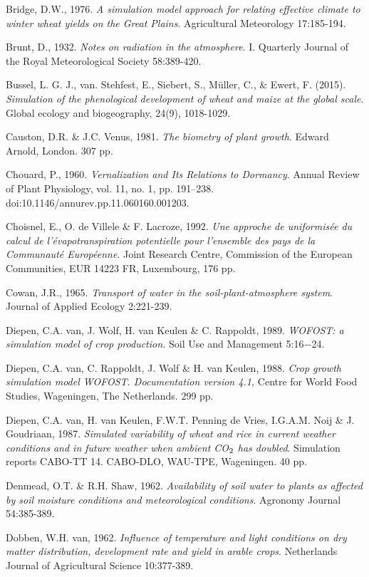Bridge, D.W., 1976. {\it A simulation model approach for relating effective climate to winter
wheat yields on the Great Plains\/}. Agricultural Meteorology 17:185-194.

Brunt, D., 1932. {\it Notes on radiation in the atmosphere\/}. I. Quarterly Journal of the Royal
Meteorological Society 58:389-420.

Bussel, L. G. J., van. Stehfest, E., Siebert, S., Müller, C., \& Ewert, F. (2015). {\it Simulation of 
the phenological development of wheat and maize at the global scale}. Global ecology and biogeography, 
24(9), 1018-1029.

Causton, D.R. \& J.C. Venus, 1981. {\it The biometry of plant growth\/}. Edward Arnold, London.
307 pp.

Chouard, P., 1960. \textit{Vernalization and Its Relations to Dormancy}. Annual Review of Plant Physiology, vol. 11, no. 1, pp. 191–238. doi:10.1146/annurev.pp.11.060160.001203.

Choisnel, E., O. de Villele \& F. Lacroze, 1992. {\it Une approche de uniformis\'{e}e du calcul de
l'\'{e}vapotranspiration potentielle pour l'ensemble des pays de la Communaut\'{e} Europ\'{e}enne\/}.
Joint Research Centre, Commission of the European Communities, EUR 14223 FR,
Luxembourg, 176 pp.

Cowan, J.R., 1965. {\it Transport of water in the soil-plant-atmosphere system\/}. Journal of
Applied Ecology 2:221-239.

Diepen, C.A. van, J. Wolf, H. van Keulen \& C. Rappoldt, 1989. {\it WOFOST: a simulation
model of crop production.\/} Soil Use and Management 5:16$-$24. 

Diepen, C.A. van, C. Rappoldt, J. Wolf \& H. van Keulen, 1988. {\it Crop growth simulation
model WOFOST. Documentation version 4.1,\/} Centre for World Food Studies, Wageningen,
The Netherlands. 299 pp. 

Diepen, C.A. van, H. van Keulen, F.W.T. Penning de Vries, I.G.A.M. Noij \& J.
Goudriaan, 1987. {\it Simulated variabil\-ity of wheat and rice in current weather conditions and
in future weather when ambient CO$_{{\rm 2}}$ has doubled\/}. Simulation reports CABO-TT 14. CABO-DLO, WAU-TPE, Wageningen. 40 pp.

Denmead, O.T. \& R.H. Shaw, 1962. {\it Availability of soil water to plants as affected by soil
moisture conditions and meteorological conditions\/}. Agronomy Journal 54:385-389.

Dobben, W.H. van, 1962. {\it Influence of temperature and light conditions on dry matter
distribution, development rate and yield in arable crops\/}. Netherlands Journal of Agricultural
Science 10:377-389.

